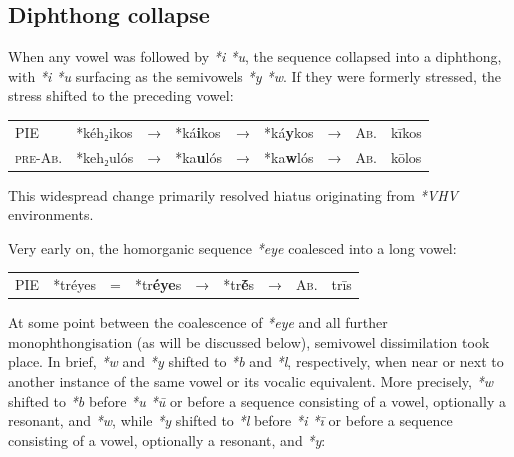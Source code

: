 \documentclass[svgnames,x11names,b5paper]{book}
\begin{document}
            \subsection{Diphthong collapse}
        
        When any vowel was followed by \textit{*i *u}, the sequence collapsed into a diphthong, with \textit{*i *u} surfacing as the semivowels \textit{*y *w}. If they were formerly stressed, the stress shifted to the preceding vowel:

            \begin{table}[H]
                \begin{center}
                \begin{tabular}{llcllllll}
                \textsc{PIE} & *kéh₂ikos & → & *ká\textbf{i}kos & → & *ká\textbf{y}kos & → & \textsc{Ab.} & kīkos\\
                \textsc{pre-Ab.} & *keh₂ulós & → & *ka\textbf{u}lós & → & *ka\textbf{w}lós & → & \textsc{Ab.} & kōlos\\
                \end{tabular}
                \end{center}
                \end{table}
        
            This widespread change primarily resolved hiatus originating from \textit{*VHV} environments.

        Very early on, the homorganic sequence \textit{*eye} coalesced into a long vowel:

            \begin{table}[H]
                \begin{center}
                \begin{tabular}{llcllllll}
                \textsc{PIE} & *tréyes & = & *tr\textbf{éye}s & → & *tr\textbf{ḗ}s & → & \textsc{Ab.} & trīs\\
                \end{tabular}
                \end{center}
                \end{table}
        
        At some point between the coalescence of \textit{*eye} and all further monophthongisation (as will be discussed below), semivowel dissimilation took place. In brief, \textit{*w} and \textit{*y} shifted to \textit{*b} and \textit{*l}, respectively, when near or next to another instance of the same vowel or its vocalic equivalent. More precisely, \textit{*w} shifted to \textit{*b} before \textit{*u *ū} or before a sequence consisting of a vowel, optionally a resonant, and \textit{*w}, while \textit{*y} shifted to \textit{*l} before \textit{*i *ī} or before a sequence consisting of a vowel, optionally a resonant, and \textit{*y}:
\end{document}
